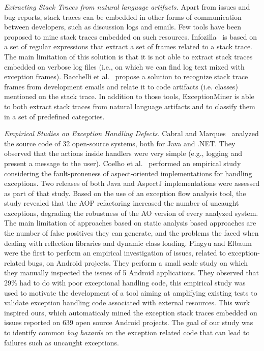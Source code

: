 \textit{Extracting Stack Traces from natural language artifacts.} 
Apart from issues and bug reports, stack traces can be embedded in other forms of
communication between developers, such as discussion logs and emails.
Few tools have been proposed to mine stack traces embedded on such resources.
 Infozilla~\cite{bettenburg2008extracting} is based on a set of regular expressions that extract a set of frames
related to a stack trace. The main limitation of this solution is that it is not
able to extract stack traces embedded on verbose log files (i.e., on which we
can find log text mixed with exception frames). Bacchelli
et al.~\cite{bacchelli2012content} propose a solution to recognize stack trace frames
from development emails and relate it to code artifacts (i.e. classes) mentioned
on the stack trace. In addition to those tools, ExceptionMiner is able to 
both extract stack traces from natural language artifacts and to 
classify them in a set of predefined categories.

\textit{Empirical Studies on Exception Handling Defects.} 
Cabral and Marques~\cite{cabral2007exception} analyzed the
source code of 32 open-source systems, both for Java and .NET. They
observed that the actions inside handlers were very simple (e.g., logging and present a
message to the user). Coelho et al.~\cite{coelho2008assessing} performed an 
empirical study considering the fault-proneness of aspect-oriented implementations 
for handling exceptions. Two releases of both Java and AspectJ implementations were 
assessed as part of that study. Based on the use of an exception
flow analysis tool, the study revealed that the AOP  refactoring increased the 
number of uncaught exceptions, degrading the robustness of the AO version of every analyzed system.
The main limitation of approaches based on static analysis based approaches are the number of false
positives they can generate, and the problems the faced when dealing with reflection libraries 
and dynamic class loading. Pingyu and Elbaum~\cite{Zhang12} were the first to perform
an empirical investigation of issues, related to exception-related bugs, on Android projects.  
They perform a small scale study on which they manually inspected the issues of 
5 Android applications. They observed that 29\% had to do with poor
exceptional handling code, this empirical study was used to motivate the development of a tool
aiming at amplifying existing tests to validate exception 
handling code associated with external resources. This work inspired ours,
 which automaticaly mined the exception stack traces embedded on issues 
reported on 639 open source Android projects. The goal of our study was
to identify common \emph{bug hazards} on the exception related code that can lead to 
failures such as uncaught exceptions. 

